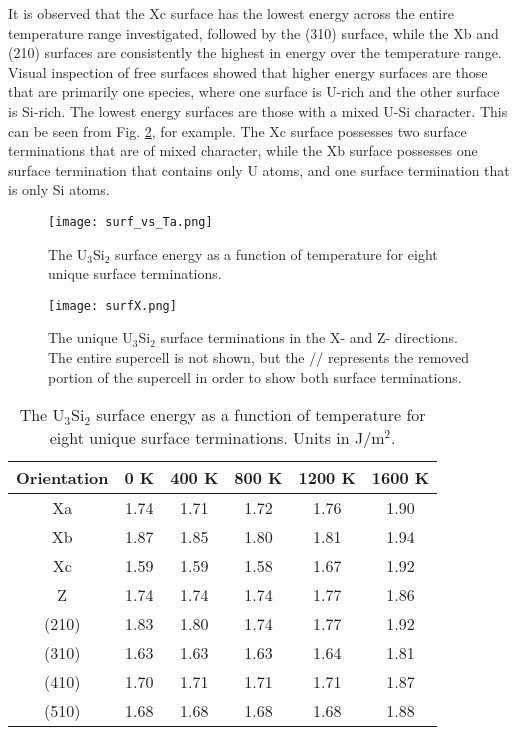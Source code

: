 \documentclass[review]{elsarticle}
\begin{document}
It is observed that the Xc surface has the lowest energy across the entire temperature range investigated, followed by the (310) surface, while the Xb and (210) surfaces are consistently the highest in energy over the temperature range. Visual inspection of free surfaces showed that higher energy surfaces are those that are primarily one species, where one surface is U-rich and the other surface is Si-rich. The lowest energy surfaces are those with a mixed U-Si character. This can be seen from Fig. \ref{fig:surfXZ}, for example. The Xc surface possesses two surface terminations that are of mixed character, while the Xb surface possesses one surface termination that contains only U atoms, and one surface termination that is only Si atoms. 



\begin{figure}[h]
 \centering
 \texttt{[image: surf\_vs\_Ta.png]} 
 \caption{The U$_{3}$Si$_{2}$ surface energy as a function of temperature for eight unique surface terminations. }
 \label{fig:surfT}
\end{figure}

\begin{figure}[h]
 \centering
 \texttt{[image: surfX.png]} 
 \caption{The unique U$_{3}$Si$_{2}$ surface terminations in the X- and Z- directions. The entire supercell is not shown, but the // represents the removed portion of the supercell in order to show both surface terminations. }
 \label{fig:surfXZ}
\end{figure}

\begin{table}[h]
\caption{The U$_{3}$Si$_{2}$ surface energy as a function of temperature for eight unique surface terminations. Units in J/m$^{2}$.} \label{tab:surfT}
\begin{center}
\begin{tabular}{|c|c|c|c|c|c|}
	\hline
	Orientation & 0 K & 400 K & 800 K & 1200 K & 1600 K\\
	 \hline
	 Xa & 1.74	 & 1.71 & 1.72 & 1.76 & 1.90 \\
	 Xb & 1.87 & 1.85 & 1.80 & 1.81 & 1.94 \\
	 Xc & 1.59	 & 1.59 & 1.58 & 1.67 & 1.92 \\
	 Z & 1.74 & 1.74 & 1.74 & 1.77 & 1.86 \\
	 (210) & 1.83 & 	1.80 & 1.74 & 1.77 & 1.92 \\
	 (310) & 1.63 & 1.63 & 1.63 & 1.64 & 1.81 \\	 
	 (410) & 1.70 & 1.71 & 1.71 & 1.71 & 1.87 \\
	 (510) & 1.68 & 1.68 & 1.68 & 1.68 & 1.88 \\
	 \hline
\end{tabular}
\end{center}
\label{default}
\end{table}
\end{document}
